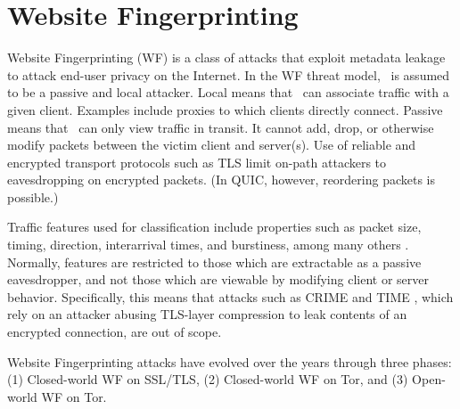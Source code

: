 \documentclass[runningheads]{llncs}
\begin{document}

\section{Website Fingerprinting}
Website Fingerprinting (WF) is a class of attacks that exploit metadata leakage to attack
end-user privacy on the Internet. In the WF threat model,
\adv\ is assumed to be a passive and local attacker. Local means that \adv\ can associate
traffic with a given client. Examples include proxies to which clients directly connect.
Passive means that \adv\ can only view traffic in transit. It cannot add, drop, or otherwise
modify packets between the victim client and server(s). Use of reliable and encrypted transport
protocols such as TLS limit on-path attackers to eavesdropping on encrypted packets. (In
QUIC, however, reordering packets is possible.)

Traffic features used for classification include properties such as packet size, timing,
direction, interarrival times, and burstiness, among many others \cite{wang2016website}. Normally, features
are restricted to those which are extractable as a passive eavesdropper, and not those which
are viewable by modifying client or server behavior. Specifically, this means that
attacks such as CRIME \cite{} and TIME \cite{}, which rely on an attacker abusing TLS-layer compression
to leak contents of an encrypted connection, are out of scope.

Website Fingerprinting attacks have evolved over the years through three phases:
(1) Closed-world WF on SSL/TLS, (2) Closed-world WF on Tor, and (3) Open-world WF on Tor.
\end{document}
